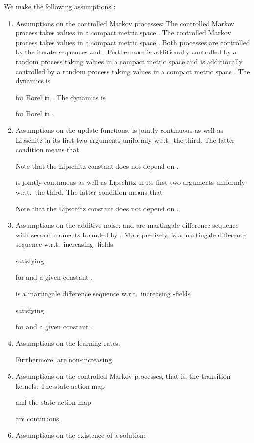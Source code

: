 \documentclass{article}
\begin{document}
We make the following assumptions \cite{Karmakar:17}:
\begin{enumerate}[label=\textbf{(A\arabic*)}]
\item Assumptions on the controlled Markov processes:
The controlled Markov process
 takes values in a compact metric space .
The controlled Markov process
 takes values in a compact metric space .
Both processes are controlled by the iterate sequences 
and  . Furthermore  is additionally
controlled by a random process  taking values in a
compact metric space  and
 is additionally
controlled by a random process 
taking values in a
compact metric space .
The  dynamics is

for  Borel in .
The  dynamics is

for  Borel in .

\item Assumptions on the update functions:
 is
jointly continuous as well as Lipschitz in
its first two arguments uniformly w.r.t.\ the third.
The latter condition means that

Note that the Lipschitz constant  does not depend on
.

 is
jointly continuous as well as Lipschitz in
its first two arguments uniformly w.r.t.\ the third.
The latter condition means that

Note that the Lipschitz constant  does not depend on
.


\item Assumptions on the additive noise:
 and 
are martingale difference sequence with second
moments bounded by .
More precisely,
 is a martingale difference sequence
w.r.t.\ increasing -fields

satisfying

for  and a given constant .

 is a martingale difference sequence
w.r.t.\ increasing -fields

satisfying

for  and a given constant .

\item
Assumptions on the learning rates:

Furthermore,  are non-increasing.

\item Assumptions on the controlled
Markov processes, that is, the transition kernels:
The state-action map

and the state-action map

are continuous.


\item Assumptions on the existence of a solution:


\end{enumerate}
\end{document}
